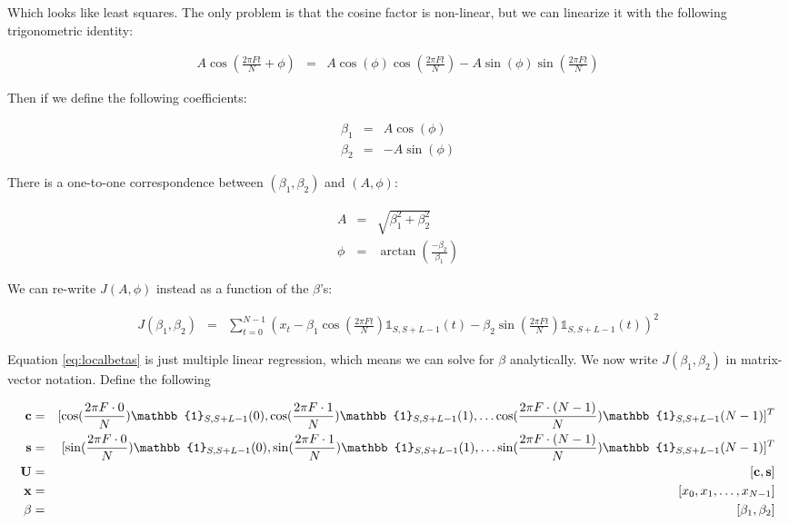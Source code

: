 \documentclass[11pt]{article}
\theoremstyle{plain}
\theoremstyle{definition}
\begin{document}
\noindent Which looks like least squares. The only problem is that the cosine factor is non-linear, but we can linearize it with the following trigonometric identity:

\begin{eqnarray}
	A \cos(\frac{2 \pi F t}{N} + \phi) &=& A\cos(\phi)\cos(\frac{2 \pi F t}{N})  - A \sin(\phi) \sin(\frac{2 \pi F t}{N})
\end{eqnarray}

\noindent Then if we define the following coefficients:

\begin{eqnarray}
	\beta_1 &=& A \cos(\phi) \nonumber \\
	\beta_2 &=& -A \sin(\phi)
\end{eqnarray}

\noindent There is a one-to-one correspondence between $(\beta_1, \beta_2)$ and $(A, \phi)$:

\begin{eqnarray}
\label{eq:aptobeta}
	A &=& \sqrt{\beta_1^2 + \beta_2^2} \nonumber \\
	\phi &=& \arctan(\frac{-\beta_2}{\beta_1})
\end{eqnarray}

\noindent We can re-write $J(A, \phi)$ instead as a function of the $\beta$'s:

\begin{eqnarray}
\label{eq:localbetas}
	J(\beta_1, \beta_2) &=& \sum_{t=0}^{N-1} (x_t - \beta_1 \cos(\frac{2 \pi F t}{N})  \mathbb{1}_{S, S+L-1}(t) - \beta_2 \sin(\frac{2 \pi F t}{N}) \mathbb{1}_{S, S+L-1}(t))^2
\end{eqnarray}

Equation \ref{eq:localbetas} is just multiple linear regression, which means we can solve for $\beta$ analytically. We now write $J(\beta_1, \beta_2)$ in matrix-vector notation. Define the following

\begin{eqnarray}
	{\bf c} &=& [\cos(\frac{2 \pi F \cdot 0}{N}) \mathbb{1}_{S,S+L-1}(0),  \cos(\frac{2 \pi F \cdot 1}{N}) \mathbb{1}_{S,S+L-1}(1), \ldots \cos(\frac{2 \pi F \cdot (N-1)}{N}) \mathbb{1}_{S,S+L-1}(N-1)]^T \nonumber \\
	{\bf s} &=& [\sin(\frac{2 \pi F \cdot 0}{N}) \mathbb{1}_{S,S+L-1}(0),  \sin(\frac{2 \pi F \cdot 1}{N}) \mathbb{1}_{S,S+L-1}(1), \ldots \sin(\frac{2 \pi F \cdot (N-1)}{N}) \mathbb{1}_{S,S+L-1}(N-1)]^T \nonumber \\
	{\bf U} &=& [{\bf c}, {\bf s}] \nonumber \\
	{\bf x} &=& [x_0, x_1, \ldots, x_{N-1}] \nonumber \\
	\beta &=& [\beta_1, \beta_2]
\end{eqnarray}
\end{document}
